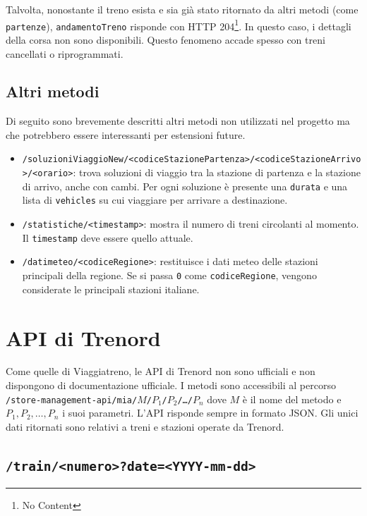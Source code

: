 \documentclass[12pt,italian]{report}
\begin{document}
Talvolta, nonostante il treno esista e sia già stato ritornato da
altri metodi (come \texttt{partenze}), \texttt{andamentoTreno}
risponde con HTTP 204\footnote{No Content}.  In questo caso, i
dettagli della corsa non sono disponibili.  Questo fenomeno accade
spesso con treni cancellati o riprogrammati.

\subsection{Altri metodi}

Di seguito sono brevemente descritti altri metodi non utilizzati nel
progetto ma che potrebbero essere interessanti per estensioni future.

\begin{itemize}
    \item
    \texttt{/soluzioniViaggioNew/\-<codiceStazionePartenza>/\-<codiceStazioneArrivo>/\-<orario>}:
    trova soluzioni di viaggio tra la stazione di partenza e la
    stazione di arrivo, anche con cambi.  Per ogni soluzione è
    presente una \texttt{durata} e una lista di \texttt{vehicles} su
    cui viaggiare per arrivare a destinazione.
    \item \texttt{/statistiche/<timestamp>}: mostra il numero di treni
    circolanti al momento. Il \texttt{timestamp} deve essere quello
    attuale.
    \item \texttt{/datimeteo/\-<codiceRegione>}: restituisce i dati
    meteo delle stazioni principali della regione. Se si passa
    \texttt{0} come \texttt{codiceRegione}, vengono considerate le
    principali stazioni italiane.
\end{itemize}

\section{API di Trenord}

Come quelle di Viaggiatreno, le API di Trenord non sono ufficiali e
non dispongono di documentazione ufficiale.  I metodi sono accessibili
al percorso
\texttt{/\-store-management-api/\-mia/\-$M$/\-$P_1$/\-$P_2$/\-\dots/\-$P_n$}
dove $M$ è il nome del metodo e $P_1, P_2, \dots, P_n$ i suoi
parametri.  L'API risponde sempre in formato JSON\@.  Gli unici dati
ritornati sono relativi a treni e stazioni operate da Trenord.

\subsection{\texttt{/train/<numero>?date=<YYYY-mm-dd>}}
\end{document}
